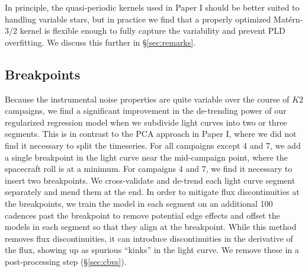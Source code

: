 \documentclass[]{emulateapj}
\begin{document}
In principle, the quasi-periodic kernels used in Paper I should be better suited to 
handling variable stars, but in practice we find that a properly optimized Mat\'ern-3/2 
kernel is flexible enough to fully capture the variability and prevent PLD overfitting.
We discuss this further in \S\ref{sec:remarks}.

\subsection{Breakpoints}
\label{sec:impl_breakpoints}
Because the instrumental noise properties are quite variable over the course of $K2$ 
campaigns, we find a significant improvement in the de-trending power of our regularized
regression model when we subdivide light curves into two or three segments. This is in contrast to
the PCA approach in Paper I, where we did not find it necessary to split the timeseries.
For all campaigns except 4 and 7, we add a single breakpoint in the light curve near the
mid-campaign point, where the spacecraft roll is at a minimum. For campaigns 4 and 7,
we find it necessary to insert two breakpoints. We cross-validate and de-trend each 
light curve segment separately and mend them at the end. In order to mitigate flux
discontinuities at the breakpoints, we train the model in each segment on an additional
100 cadences past the breakpoint to remove potential edge effects and offset the models
in each segment so that they align at the breakpoint.
While this method removes flux discontinuities, it can introduce discontinuities in the
derivative of the flux, showing up as spurious ``kinks'' in the light curve. We 
remove these in a post-processing step (\S\ref{sec:cbvs}).
\end{document}
